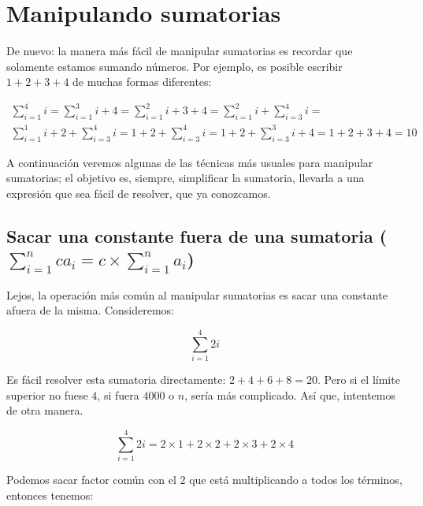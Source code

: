 \section{Manipulando sumatorias}

De nuevo: la manera más fácil de manipular sumatorias es recordar que solamente estamos sumando números. Por ejemplo, es posible escribir $1+2+3+4$ de muchas formas diferentes:

\begin{gather*}
\sum_{i=1}^4{i}=\sum_{i=1}^3{i} + 4 =\sum_{i=1}^2{i} + 3 + 4 = \sum_{i=1}^2{i} + \sum_{i=3}^4{i} = \\
\sum_{i=1}^1{i} + 2 + \sum_{i=3}^4{i} = 1 + 2 + \sum_{i=3}^4{i} = 1 + 2 + \sum_{i=3}^3{i} + 4 = 1 + 2 + 3 + 4 = 10
\end{gather*}

A continuación veremos algunas de las técnicas más usuales para manipular sumatorias; el objetivo es, siempre, simplificar la sumatoria, llevarla a una expresión que sea fácil de resolver, que ya conozcamos.





\newcommand{\constante}{\sum_{i=1}^{n}{c a_i} =  c \times \sum_{i=1}^{n}{a_i}}
\subsection{Sacar una constante fuera de una sumatoria ($\constante$)}

Lejos, la operación más común al manipular sumatorias es sacar una constante afuera de la misma. Consideremos:

\begin{equation*}
\sum_{i=1}^4{2i}
\end{equation*}

Es fácil resolver esta sumatoria directamente: $ 2 + 4 + 6 + 8 = 20 $. Pero si el límite superior no fuese $4$, si fuera $4000$ o $n$, sería más complicado. Así que, intentemos de otra manera.

\begin{equation*}
\sum_{i=1}^4{2i} = 2 \times 1 +2 \times 2+2 \times 3+2 \times 4
\end{equation*}

Podemos sacar factor común con el 2 que está multiplicando a todos los términos, entonces tenemos:

